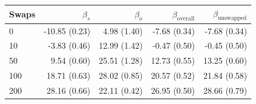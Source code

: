 \begin{table}[H]
\begin{tabular}{l rrrr}
\toprule
Swaps & $\beta_s$ & $\beta_o$ & $\beta_{\mathrm{overall}}$ & $\beta_{\mathrm{unswapped}}$ \\
\midrule
0 & -10.85 (0.23) & 4.98 (1.40) & -7.68 (0.34) & -7.68 (0.34) \\
10 & -3.83 (0.46) & 12.99 (1.42) & -0.47 (0.50) & -0.45 (0.50) \\
50 & 9.54 (0.60) & 25.51 (1.28) & 12.73 (0.55) & 13.25 (0.60) \\
100 & 18.71 (0.63) & 28.02 (0.85) & 20.57 (0.52) & 21.84 (0.58) \\
200 & 28.16 (0.66) & 22.11 (0.42) & 26.95 (0.50) & 28.66 (0.79) \\
\bottomrule
\end{tabular}
\end{table}
